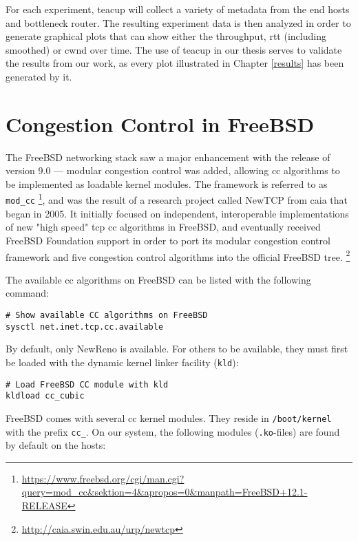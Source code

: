 For each experiment, \gls{teacup} will collect a variety of metadata from the end hosts and bottleneck router. The resulting experiment data is then analyzed in order to generate graphical plots that can show either the throughput, \gls{rtt} (including smoothed) or \gls{cwnd} over time. The use of \gls{teacup} in our thesis serves to validate the results from our work, as every plot illustrated in Chapter \ref{results} has been generated by it.










\section{Congestion Control in FreeBSD}

The FreeBSD networking stack saw a major enhancement with the release of version 9.0 --- modular congestion control was added, allowing \gls{cc} algorithms to be implemented as loadable kernel modules. The framework is referred to as \lstinline{mod_cc} \footnote{\url{https://www.freebsd.org/cgi/man.cgi?query=mod_cc&sektion=4&apropos=0&manpath=FreeBSD+12.1-RELEASE}}, and was the result of a research project called NewTCP from \gls{caia} that began in 2005. It initially focused on independent, interoperable implementations of new "high speed" \gls{tcp} \gls{cc} algorithms in FreeBSD, and eventually received FreeBSD Foundation support in order to port its modular congestion control framework and five congestion control algorithms into the official FreeBSD tree. \footnote{\url{http://caia.swin.edu.au/urp/newtcp}}

The available \gls{cc} algorithms on FreeBSD can be listed with the following command:

\begin{verbatim}
# Show available CC algorithms on FreeBSD
sysctl net.inet.tcp.cc.available
\end{verbatim}
By default, only NewReno is available. For others to be available, they must first be loaded with the dynamic kernel linker facility (\lstinline{kld}):

\begin{verbatim}
# Load FreeBSD CC module with kld
kldload cc_cubic
\end{verbatim}
FreeBSD comes with several \gls{cc} kernel modules. They reside in \lstinline{/boot/kernel} with the prefix \lstinline{cc_}. On our system, the following modules (\lstinline{.ko}-files) are found by default on the hosts:

